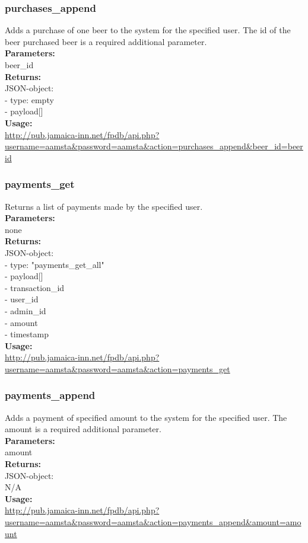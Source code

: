 \documentclass{article}
\begin{document}
\subsubsection{purchases\_append}
Adds a purchase of one beer to the system for the specified user. The id of the beer purchased beer is a required additional parameter.\\
\textbf{Parameters:}\\
beer\_id\\
\textbf{Returns:}\\
JSON-object:\\
- type: empty\\
- payload[]\\
\textbf{Usage:}\\
\url{http://pub.jamaica-inn.net/fpdb/api.php?username=aamsta\&password=aamsta\&action=purchases\_append\&beer\_id=beerid}\\
  
\subsubsection{payments\_get}
Returns a list of payments made by the specified user.\\
\textbf{Parameters:}\\
none\\
\textbf{Returns:}\\
JSON-object:\\
- type: "payments\_get\_all"\\
- payload[]\\
\indent - transaction\_id\\
\indent - user\_id\\
\indent - admin\_id\\
\indent - amount\\
\indent - timestamp\\
\textbf{Usage:}\\
\url{http://pub.jamaica-inn.net/fpdb/api.php?username=aamsta\&password=aamsta\&action=payments\_get}\\

\subsubsection{payments\_append}
Adds a payment of specified amount to the system for the specified user. The amount is a required additional parameter.\\
\textbf{Parameters:}\\
amount\\
\textbf{Returns:}\\
JSON-object:\\
N/A\\
\textbf{Usage:}\\
\url{http://pub.jamaica-inn.net/fpdb/api.php?username=aamsta\&password=aamsta\&action=payments\_append\&amount=amount}\\
\end{document}
